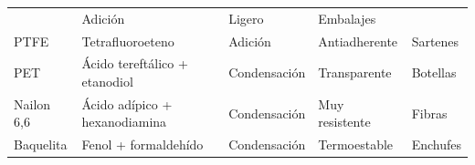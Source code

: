 \begin{center}
\begin{tabular}{lllll}
&

Adición

&

Ligero

&

Embalajes

\\

PTFE

&

Tetrafluoroeteno

&

Adición

&

Antiadherente

&

Sartenes

\\

PET

&

Ácido tereftálico +
etanodiol

&

Condensación

&

Transparente

&

Botellas

\\

Nailon 6,6

&

Ácido adípico +
hexanodiamina

&

Condensación

&

Muy resistente

&

Fibras

\\

Baquelita

&

Fenol +
formaldehído

&

Condensación

&

Termoestable

&

Enchufes

\\

\bottomrule

\end{tabular}

\end{center}

